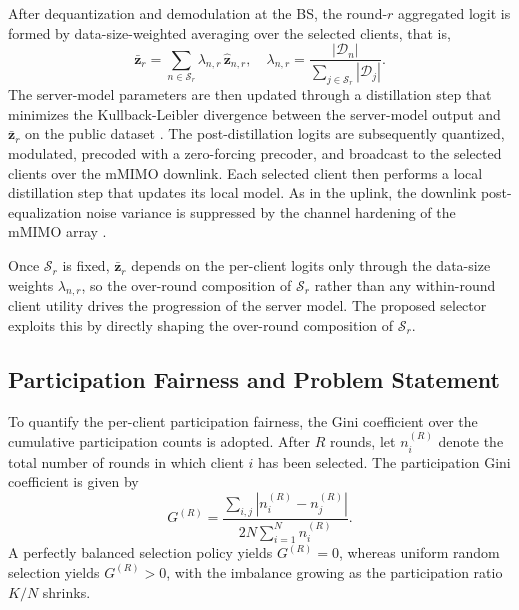 \documentclass[journal]{IEEEtran}
\begin{document}
After dequantization and demodulation at the BS, the round-$r$ aggregated logit is formed by data-size-weighted averaging over the selected clients, that is,
\begin{equation}
\bar{\bm{z}}_r = \sum_{n \in \mathcal{S}_r} \lambda_{n,r} \, \hat{\bm{z}}_{n,r}, \quad \lambda_{n,r} = \frac{|\mathcal{D}_n|}{\sum_{j \in \mathcal{S}_r} |\mathcal{D}_j|}.
\label{eq:agg}
\end{equation}
The server-model parameters are then updated through a distillation step that minimizes the Kullback-Leibler divergence between the server-model output and $\bar{\bm{z}}_r$ on the public dataset \cite{hinton2015distilling}. The post-distillation logits are subsequently quantized, modulated, precoded with a zero-forcing precoder, and broadcast to the selected clients over the mMIMO downlink. Each selected client then performs a local distillation step that updates its local model. As in the uplink, the downlink post-equalization noise variance is suppressed by the channel hardening of the mMIMO array \cite{mu2024fedtskd}.

Once $\mathcal{S}_r$ is fixed, $\bar{\bm{z}}_r$ depends on the per-client logits only through the data-size weights $\lambda_{n,r}$, so the over-round composition of $\mathcal{S}_r$ rather than any within-round client utility drives the progression of the server model. The proposed selector exploits this by directly shaping the over-round composition of $\mathcal{S}_r$.

\subsection{Participation Fairness and Problem Statement}
\label{ssec:problem-statement}

To quantify the per-client participation fairness, the Gini coefficient over the cumulative participation counts is adopted. After $R$ rounds, let $n_i^{(R)}$ denote the total number of rounds in which client $i$ has been selected. The participation Gini coefficient is given by
\begin{equation}
G^{(R)} = \frac{\sum_{i,j} \left|n_i^{(R)} - n_j^{(R)}\right|}{2N \sum_{i=1}^{N} n_i^{(R)}}.
\label{eq:gini}
\end{equation}
A perfectly balanced selection policy yields $G^{(R)} = 0$, whereas uniform random selection yields $G^{(R)} > 0$, with the imbalance growing as the participation ratio $K/N$ shrinks.
\end{document}
